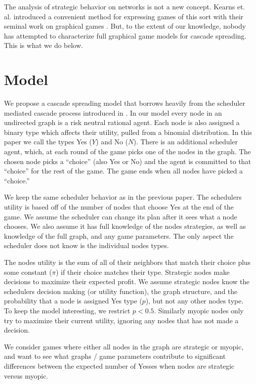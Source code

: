 \documentclass{article}
\begin{document}
The analysis of strategic behavior on networks is not a new
concept. Kearns et. al.  introduced a convenient method for expressing
games of this sort with their seminal work on graphical games
\cite{Kearns01}. But, to the extent of our knowledge, nobody has
attempted to characterize full graphical game models for cascade
spreading.  This is what we do below.


\section{Model}
\label{prob_statement}

We propose a cascade spreading model that borrows heavily from the
scheduler mediated cascade process introduced in
\cite{Chierichetti12}. In our model every node in an undirected graph
is a risk neutral rational agent. Each node is also assigned a binary
type which affects their utility, pulled from a binomial
distribution. In this paper we call the types Yes ($Y$) and No
($N$). There is an additional scheduler agent, which, at each round of
the game picks one of the nodes in the graph. The chosen node picks a
``choice'' (also Yes or No) and the agent is committed to that
``choice'' for the rest of the game. The game ends when all nodes have
picked a ``choice.''

We keep the same scheduler behavior as in the previous paper. The
schedulers utility is based off of the number of nodes that choose Yes
at the end of the game. We assume the scheduler can change its plan
after it sees what a node chooses. We also assume it has full
knowledge of the nodes strategies, as well as knowledge of the full
graph, and any game parameters. The only aspect the scheduler does not
know is the individual nodes types.

The nodes utility is the sum of all of their neighbors that match
their choice plus some constant ($\pi$) if their choice matches their
type. Strategic nodes make decisions to maximize their expected
profit. We assume strategic nodes know the schedulers decision making
(or utility function), the graph structure, and the probability that a
node is assigned Yes type ($p$), but not any other nodes type. To keep
the model interesting, we restrict $p < 0.5$. Similarly myopic nodes
only try to maximize their current utility, ignoring any nodes that
has not made a decision.

We consider games where either all nodes in the graph are strategic or
myopic, and want to see what graphs / game parameters contribute to
significant differences between the expected number of Yesses when
nodes are strategic versus myopic.
\end{document}
